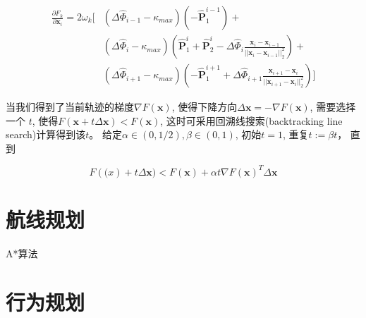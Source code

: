 \begin{equation} 
  \begin{aligned}
    \frac{\partial F_k}{\partial \bm{x}_i }
    = 2 \omega_k \Bigg[
    &(\Delta \hat{\Phi}_{i-1}-\kappa_{max}) \left(-\hat{\bm{P}}_1^{i-1} \right) +  \\
    &(\Delta \hat{\Phi}_{i}-\kappa_{max}) \left( \hat{\bm{P}}_1^{i}+\hat{\bm{P}}_2^{i}
    -\Delta \hat{\Phi}_i \frac{\bm{x}_i-\bm{x}_{i-1}}{||\bm{x}_i-\bm{x}_{i-1}||_2^2} \right) + \\
    &(\Delta \hat{\Phi}_{i+1}-\kappa_{max}) \left( -\hat{\bm{P}}_1^{i+1} + 
    \Delta \hat{\Phi}_{i+1} \frac{\bm{x}_{i+1}-\bm{x}_i}{||\bm{x}_{i+1}-\bm{x}_i||_2^2} \right)
    \Bigg]
  \end{aligned}
\end{equation}

当我们得到了当前轨迹的梯度$\nabla F(\bm{x})$, 使得下降方向$\Delta \bm{x}=-\nabla F(\bm{x})$, 需要选择一个
$t$, 使得$F( \bm{x} + t \Delta \bm{x})< F(\bm{x})$, 这时可采用回溯线搜索(backtracking line search)计算得到该$t$。
给定$\alpha \in (0,1/2), \beta \in (0,1)$, 初始$t=1$, 重复$t:=\beta t$， 直到

\begin{equation} 
  F(\bm(x)+t \Delta \bm{x}) < F(\bm{x}) + \alpha t \nabla F(\bm{x})^T \Delta \bm{x}
\end{equation}



\section{航线规划}
\label{sec:routeplanning}

A*算法

\section{行为规划}
\label{sec:behav}

